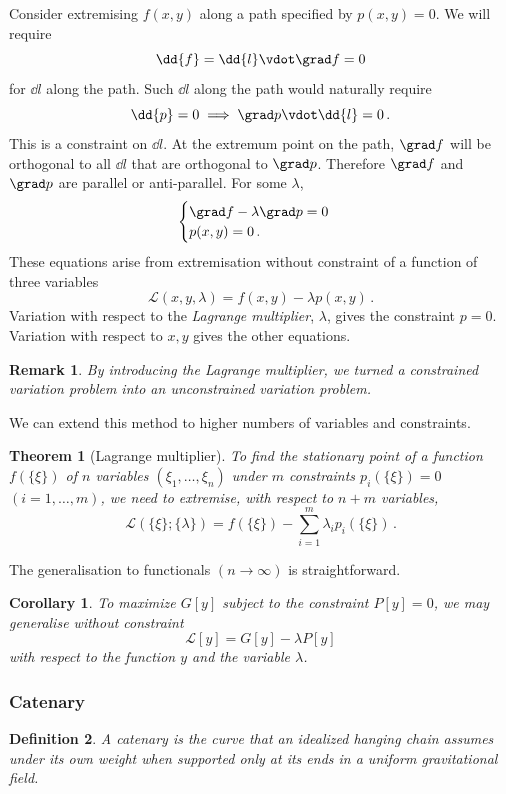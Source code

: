 \documentclass{article}
\theoremstyle{plain}\theoremheaderfont{\normalfont\itshape}\theorembodyfont{\rmfamily}\theoremseparator{.}\newtheorem*{rem}{Remark}\newtheorem*{ex}{Example}\newtheorem*{proof}{Proof}\newtheorem*{altp}{Alternative proof}
\theoremstyle{plain}\theoremheaderfont{\normalfont\bfseries}\theorembodyfont{\rmfamily}\theoremseparator{.}\newtheorem{thm}{Theorem}[section]\newtheorem{lem}[thm]{Lemma}\newtheorem{prop}[thm]{Proposition}\newtheorem*{cor}{Corollary}\newtheorem{defn}[thm]{Definition}\newtheorem{clm}[thm]{Claim}\newtheorem{clminproof}{Claim}
\theoremstyle{break}\theoremheaderfont{\normalfont\itshape}\theorembodyfont{\rmfamily}\theoremseparator{.\medskip}\newtheorem*{proofskip}{Proof}\newtheorem*{exs}{Examples}\newtheorem*{rems}{Remarks}
\theoremstyle{break}\theoremheaderfont{\normalfont\bfseries}\theorembodyfont{\rmfamily}\theoremseparator{.\medskip}\newtheorem{lemskip}[thm]{Lemma}\newtheorem{defnskip}[thm]{Definition}\newtheorem{propskip}[thm]{Proposition}\newtheorem{thmskip}[thm]{Theorem}
\numberwithin{equation}{section}
\begin{document}
	Consider extremising \(f(x,y)\) along a path specified by \(p(x,y)=0\). We will require
	\[\dd{f}=\dd{l}\vdot\grad f=0\]
	for \(\dd{l}\) along the path. Such \(\dd{l}\) along the path would naturally require
	\[\dd{p}=0\implies \grad p\vdot\dd{l}=0\,.\]
	This is a constraint on \(\dd{l}\). At the extremum point on the path, \(\grad f\) will be orthogonal to all \(\dd{l}\) that are orthogonal to \(\grad p\). Therefore \(\grad f\) and \(\grad p\) are parallel or anti-parallel. For some \(\lambda\),
	\[\begin{cases}
		\grad f-\lambda \grad p=0\\
		p(x,y)=0\,.
	\end{cases}\]
	These equations arise from extremisation without constraint of a function of three variables
	\[\mathcal{L}(x,y,\lambda)=f(x,y)-\lambda p(x,y)\,.\]
	Variation with respect to the \textit{Lagrange multiplier}, \(\lambda\), gives the constraint \(p=0\). Variation with respect to \(x,y\) gives the other equations.

	\begin{rem}
		By introducing the Lagrange multiplier, we turned a constrained variation problem into an unconstrained variation problem.
	\end{rem}

	We can extend this method to higher numbers of variables and constraints.

	\begin{thm}[Lagrange multiplier]		
		To find the stationary point of a function \(f(\{\xi\})\) of \(n\) variables \((\xi_1,\dots,\xi_n)\) under \(m\) constraints \(p_i(\{\xi\})=0\) \((i=1,\dots,m)\), we need to extremise, with respect to \(n+m\) variables,
		\[\mathcal{L}(\{\xi\};\{\lambda\})=f(\{\xi\})-\sum_{i=1}^{m}\lambda_i p_i(\{\xi\})\,.\]
	\end{thm}
	The generalisation to functionals \((n\to\infty)\) is straightforward.
	\begin{cor}
		To maximize \(G[y]\) subject to the constraint \(P[y]=0\), we may generalise without constraint
		\[\mathcal{L}[y]=G[y]-\lambda P[y]\]
		with respect to the function \(y\) and the variable \(\lambda\).
	\end{cor}
	\subsubsection{Catenary}
	\begin{defn}
		A \textit{catenary} is the curve that an idealized hanging chain assumes under its own weight when supported only at its ends in a uniform gravitational field.
	\end{defn}
	
\end{document}
